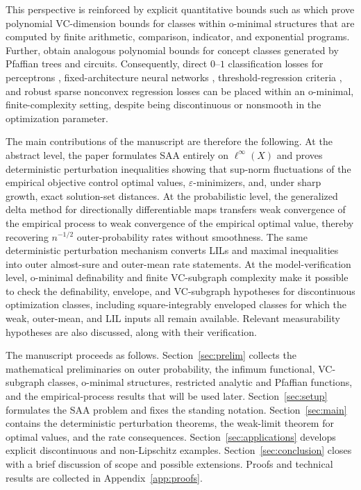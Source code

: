 \documentclass[11pt]{article}
\begin{document}
This perspective is reinforced by explicit quantitative bounds such
as \citet[Theorems~8.4 and~8.14]{AnthonyBartlett2009} which prove
polynomial VC-dimension bounds for classes within o-minimal structures
that are computed by finite arithmetic, comparison, indicator, and
exponential programs. Further, \citet{MontanaPardo2009} obtain analogous
polynomial bounds for concept classes generated by Pfaffian trees
and circuits. Consequently, direct $0$--$1$ classification losses
for perceptrons \citep{LiLin2007,NguyenSanner2013}, fixed-architecture
neural networks \citep[Section~7.2]{Westerhout2024}, threshold-regression
criteria \citep{Hansen2000,KoulQianSurgailis2003}, and robust sparse
nonconvex regression losses \citep{YeYingShaoLiChen2017,BucciniEtAl2020}
can be placed within an o-minimal, finite-complexity setting, despite
being discontinuous or nonsmooth in the optimization parameter.

The main contributions of the manuscript are therefore the following.
At the abstract level, the paper formulates SAA entirely on $\ell^{\infty}(X)$
and proves deterministic perturbation inequalities showing that sup-norm
fluctuations of the empirical objective control optimal values, $\varepsilon$-minimizers,
and, under sharp growth, exact solution-set distances. At the probabilistic
level, the generalized delta method for directionally differentiable
maps transfers weak convergence of the empirical process to weak convergence
of the empirical optimal value, thereby recovering $n^{-1/2}$ outer-probability
rates without smoothness. The same deterministic perturbation mechanism
converts LILs and maximal inequalities into outer almost-sure and outer-mean
rate statements. At the model-verification level, o-minimal definability
and finite VC-subgraph complexity make it possible to check the definability,
envelope, and VC-subgraph hypotheses for discontinuous optimization
classes, including square-integrably enveloped classes for which the
weak, outer-mean, and LIL inputs all remain available. Relevant
measurability hypotheses are also discussed, along with their verification.

The manuscript proceeds as follows. Section~\ref{sec:prelim} collects
the mathematical preliminaries on outer probability, the infimum functional,
VC-subgraph classes, o-minimal structures, restricted analytic and
Pfaffian functions, and the empirical-process results that will be
used later. Section~\ref{sec:setup} formulates the SAA problem and
fixes the standing notation. Section~\ref{sec:main} contains the
deterministic perturbation theorems, the weak-limit theorem for optimal
values, and the rate consequences. Section~\ref{sec:applications}
develops explicit discontinuous and non-Lipschitz examples. Section~\ref{sec:conclusion}
closes with a brief discussion of scope and possible extensions. Proofs and technical results
are collected in Appendix~\ref{app:proofs}.
\end{document}
